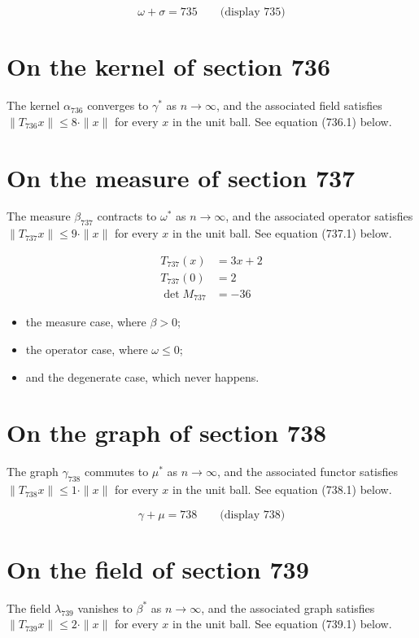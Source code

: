 \documentclass{article}
\begin{document}
$$
\omega + \sigma = 735 \qquad \text{(display 735)}
$$

\section{On the kernel of section 736}
The kernel $\alpha_{736}$ converges to $\gamma^{*}$ as $n \to \infty$,
and the associated field satisfies $\|T_{736} x\| \leq 8 \cdot \|x\|$
for every $x$ in the unit ball. See equation (736.1) below.

\section{On the measure of section 737}
The measure $\beta_{737}$ contracts to $\omega^{*}$ as $n \to \infty$,
and the associated operator satisfies $\|T_{737} x\| \leq 9 \cdot \|x\|$
for every $x$ in the unit ball. See equation (737.1) below.

\begin{align}
T_{737}(x) &= 3 x + 2 \\
T_{737}(0) &= 2 \\
\det M_{737} &= -36
\end{align}

\begin{itemize}
  \item the measure case, where $\beta > 0$;
  \item the operator case, where $\omega \leq 0$;
  \item and the degenerate case, which never happens.
\end{itemize}

\section{On the graph of section 738}
The graph $\gamma_{738}$ commutes to $\mu^{*}$ as $n \to \infty$,
and the associated functor satisfies $\|T_{738} x\| \leq 1 \cdot \|x\|$
for every $x$ in the unit ball. See equation (738.1) below.

$$
\gamma + \mu = 738 \qquad \text{(display 738)}
$$

\section{On the field of section 739}
The field $\lambda_{739}$ vanishes to $\beta^{*}$ as $n \to \infty$,
and the associated graph satisfies $\|T_{739} x\| \leq 2 \cdot \|x\|$
for every $x$ in the unit ball. See equation (739.1) below.
\end{document}
